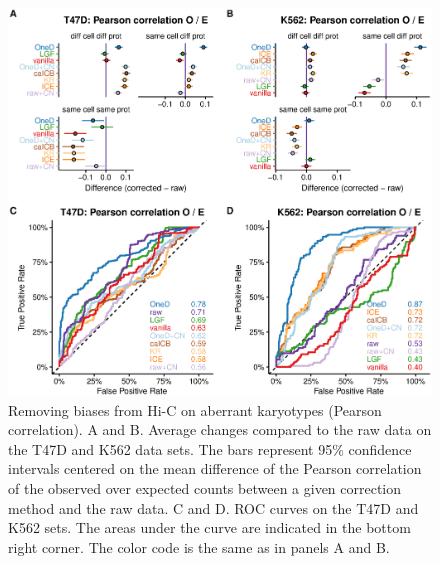 \documentclass[12pt]{report}
\begin{document}
\begin{figure}
	\centerline{\includegraphics[width=\textwidth]{nar_figures/supp_figure_5.eps}}
  \caption{Removing biases from Hi-C on aberrant karyotypes (Pearson
correlation). A and B. Average changes compared to the raw data on the
T47D and K562 data sets. The bars represent 95\% confidence intervals
centered on the mean difference of the Pearson correlation of the observed
over expected counts between a given correction method and the raw data. C
and D. ROC curves on the T47D and K562 sets. The areas under the curve are
indicated in the bottom right corner. The color code is the same as in
panels A and B.}
\end{figure}
\end{document}

